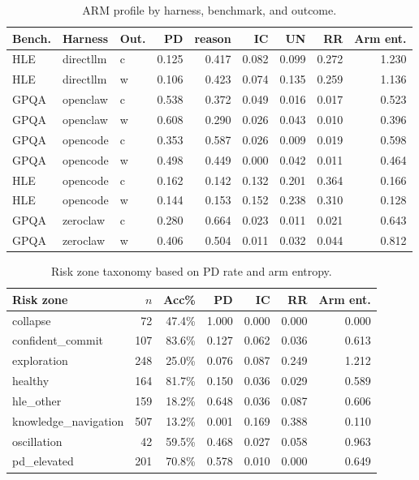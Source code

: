 \begin{table}[t]
\centering\small
\caption{ARM profile by harness, benchmark, and outcome.}
\label{tab:arm-macro-hbo}
\begin{tabular}{lllrrrrrr}\toprule
Bench. & Harness & Out. & PD & reason & IC & UN & RR & Arm ent. \\ \midrule
  HLE & directllm & c & 0.125 & 0.417 & 0.082 & 0.099 & 0.272 & 1.230 \\
  HLE & directllm & w & 0.106 & 0.423 & 0.074 & 0.135 & 0.259 & 1.136 \\
  GPQA & openclaw & c & 0.538 & 0.372 & 0.049 & 0.016 & 0.017 & 0.523 \\
  GPQA & openclaw & w & 0.608 & 0.290 & 0.026 & 0.043 & 0.010 & 0.396 \\
  GPQA & opencode & c & 0.353 & 0.587 & 0.026 & 0.009 & 0.019 & 0.598 \\
  GPQA & opencode & w & 0.498 & 0.449 & 0.000 & 0.042 & 0.011 & 0.464 \\
  HLE & opencode & c & 0.162 & 0.142 & 0.132 & 0.201 & 0.364 & 0.166 \\
  HLE & opencode & w & 0.144 & 0.153 & 0.152 & 0.238 & 0.310 & 0.128 \\
  GPQA & zeroclaw & c & 0.280 & 0.664 & 0.023 & 0.011 & 0.021 & 0.643 \\
  GPQA & zeroclaw & w & 0.406 & 0.504 & 0.011 & 0.032 & 0.044 & 0.812 \\
\bottomrule\end{tabular}\end{table}
\begin{table}[t]
\centering\small
\caption{Risk zone taxonomy based on PD rate and arm entropy.}
\label{tab:arm-macro-risk}
\begin{tabular}{lrrrrrr}\toprule
Risk zone & $n$ & Acc\% & PD & IC & RR & Arm ent. \\ \midrule
  collapse & 72 & 47.4\% & 1.000 & 0.000 & 0.000 & 0.000 \\
  confident_commit & 107 & 83.6\% & 0.127 & 0.062 & 0.036 & 0.613 \\
  exploration & 248 & 25.0\% & 0.076 & 0.087 & 0.249 & 1.212 \\
  healthy & 164 & 81.7\% & 0.150 & 0.036 & 0.029 & 0.589 \\
  hle_other & 159 & 18.2\% & 0.648 & 0.036 & 0.087 & 0.606 \\
  knowledge_navigation & 507 & 13.2\% & 0.001 & 0.169 & 0.388 & 0.110 \\
  oscillation & 42 & 59.5\% & 0.468 & 0.027 & 0.058 & 0.963 \\
  pd_elevated & 201 & 70.8\% & 0.578 & 0.010 & 0.000 & 0.649 \\
\bottomrule\end{tabular}\end{table}